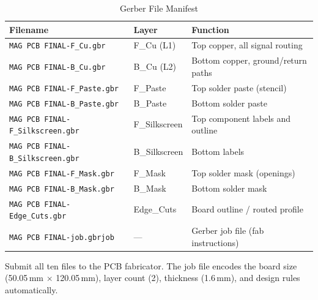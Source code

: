 \documentclass[12pt]{article}
\begin{document}
\begin{table}[H]
  \centering
  \caption{Gerber File Manifest}
  \begin{tabular}{lll}
    \toprule
    \textbf{Filename} & \textbf{Layer} & \textbf{Function} \\
    \midrule
    \texttt{MAG PCB FINAL-F\_Cu.gbr}         & F\_Cu (L1)       & Top copper, all signal routing \\
    \texttt{MAG PCB FINAL-B\_Cu.gbr}         & B\_Cu (L2)       & Bottom copper, ground/return paths \\
    \texttt{MAG PCB FINAL-F\_Paste.gbr}      & F\_Paste         & Top solder paste (stencil) \\
    \texttt{MAG PCB FINAL-B\_Paste.gbr}      & B\_Paste         & Bottom solder paste \\
    \texttt{MAG PCB FINAL-F\_Silkscreen.gbr} & F\_Silkscreen    & Top component labels and outline \\
    \texttt{MAG PCB FINAL-B\_Silkscreen.gbr} & B\_Silkscreen    & Bottom labels \\
    \texttt{MAG PCB FINAL-F\_Mask.gbr}       & F\_Mask          & Top solder mask (openings) \\
    \texttt{MAG PCB FINAL-B\_Mask.gbr}       & B\_Mask          & Bottom solder mask \\
    \texttt{MAG PCB FINAL-Edge\_Cuts.gbr}    & Edge\_Cuts       & Board outline / routed profile \\
    \texttt{MAG PCB FINAL-job.gbrjob}        & ---              & Gerber job file (fab instructions) \\
    \bottomrule
  \end{tabular}
  \label{tab:gerbers}
\end{table}

Submit all ten files to the PCB fabricator. The job file encodes the
board size (50.05\,mm $\times$ 120.05\,mm), layer count (2),
thickness (1.6\,mm), and design rules automatically.
\end{document}
